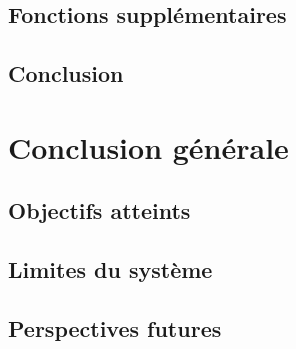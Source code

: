 \documentclass[]{report}
\begin{document}
\section{Fonctions supplémentaires}

\section{Conclusion}


\chapter{Conclusion générale}
\section{Objectifs atteints}
\section{Limites du système}
\section{Perspectives futures}		



\end{document}
